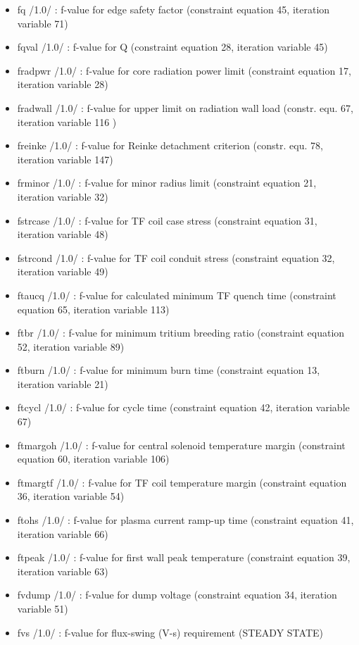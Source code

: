 \documentclass[]{article}
\begin{document}
\begin{itemize}
\item
  fq /1.0/ : f-value for edge safety factor (constraint equation 45,
  iteration variable 71)
\item
  fqval /1.0/ : f-value for Q (constraint equation 28, iteration
  variable 45)
\item
  fradpwr /1.0/ : f-value for core radiation power limit (constraint
  equation 17, iteration variable 28)
\item
  fradwall /1.0/ : f-value for upper limit on radiation wall load
  (constr. equ. 67, iteration variable 116 )
\item
  freinke /1.0/ : f-value for Reinke detachment criterion (constr. equ.
  78, iteration variable 147)
\item
  frminor /1.0/ : f-value for minor radius limit (constraint equation
  21, iteration variable 32)
\item
  fstrcase /1.0/ : f-value for TF coil case stress (constraint equation
  31, iteration variable 48)
\item
  fstrcond /1.0/ : f-value for TF coil conduit stress (constraint
  equation 32, iteration variable 49)
\item
  ftaucq /1.0/ : f-value for calculated minimum TF quench time
  (constraint equation 65, iteration variable 113)
\item
  ftbr /1.0/ : f-value for minimum tritium breeding ratio (constraint
  equation 52, iteration variable 89)
\item
  ftburn /1.0/ : f-value for minimum burn time (constraint equation 13,
  iteration variable 21)
\item
  ftcycl /1.0/ : f-value for cycle time (constraint equation 42,
  iteration variable 67)
\item
  ftmargoh /1.0/ : f-value for central solenoid temperature margin
  (constraint equation 60, iteration variable 106)
\item
  ftmargtf /1.0/ : f-value for TF coil temperature margin (constraint
  equation 36, iteration variable 54)
\item
  ftohs /1.0/ : f-value for plasma current ramp-up time (constraint
  equation 41, iteration variable 66)
\item
  ftpeak /1.0/ : f-value for first wall peak temperature (constraint
  equation 39, iteration variable 63)
\item
  fvdump /1.0/ : f-value for dump voltage (constraint equation 34,
  iteration variable 51)
\item
  fvs /1.0/ : f-value for flux-swing (V-s) requirement (STEADY STATE)

\end{itemize}
\end{document}
